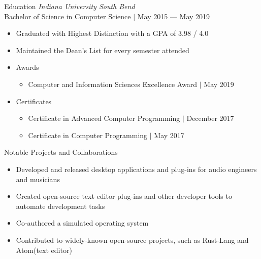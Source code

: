 \documentclass{resume}
\newenvironment{tightlySpacedList}
{ \begin{itemize}
    \setlength{\itemsep}{0pt}
    \setlength{\parskip}{0pt}
    \setlength{\parsep}{0pt}     }
{ \end{itemize}                  }
\begin{document}
\begin{rSection}{Education}
\textit{Indiana University South Bend}
\\Bachelor of Science in Computer Science $\mid$ May 2015 --- May 2019
\begin{tightlySpacedList}
    \item Graduated with Highest Distinction with a GPA of 3.98 / 4.0
    \item Maintained the Dean's List for every semester attended
    \item Awards
    \begin{tightlySpacedList}
        \item Computer and Information Sciences Excellence Award $\mid$ May 2019
    \end{tightlySpacedList}
    \item Certificates
    \begin{tightlySpacedList}
        \item Certificate in Advanced Computer Programming $\mid$ December 2017
        \item Certificate in Computer Programming $\mid$ May 2017
    \end{tightlySpacedList}
\end{tightlySpacedList}
\end{rSection}

\newpage

\begin{rSection}{Notable Projects and Collaborations}
\begin{tightlySpacedList}
    \item Developed and released desktop applications and plug-ins for audio
     engineers and musicians
    \item Created open-source text editor plug-ins and other developer tools to
     automate development tasks
    \item Co-authored a simulated operating system
    \item Contributed to widely-known open-source projects, such as Rust-Lang
     and Atom(text editor)
\end{tightlySpacedList}
\end{rSection}
\end{document}
